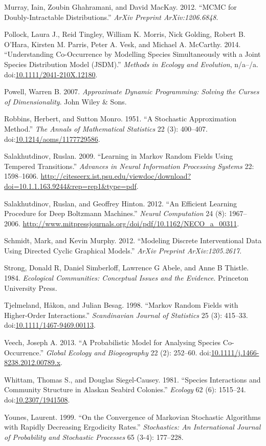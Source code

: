 Murray, Iain, Zoubin Ghahramani, and David MacKay. 2012. ``MCMC for
Doubly-Intractable Distributions.'' \emph{ArXiv Preprint
ArXiv:1206.6848}.

Pollock, Laura J., Reid Tingley, William K. Morris, Nick Golding, Robert
B. O'Hara, Kirsten M. Parris, Peter A. Vesk, and Michael A. McCarthy.
2014. ``Understanding Co-Occurrence by Modelling Species Simultaneously
with a Joint Species Distribution Model (JSDM).'' \emph{Methods in
Ecology and Evolution}, n/a--/a.
doi:\href{http://dx.doi.org/10.1111/2041-210X.12180}{10.1111/2041-210X.12180}.

Powell, Warren B. 2007. \emph{Approximate Dynamic Programming: Solving
the Curses of Dimensionality}. John Wiley \& Sons.

Robbins, Herbert, and Sutton Monro. 1951. ``A Stochastic Approximation
Method.'' \emph{The Annals of Mathematical Statistics} 22 (3): 400--407.
doi:\href{http://dx.doi.org/10.1214/aoms/1177729586}{10.1214/aoms/1177729586}.

Salakhutdinov, Ruslan. 2009. ``Learning in Markov Random Fields Using
Tempered Transitions.'' \emph{Advances in Neural Information Processing
Systems} 22: 1598--1606.
\url{http://citeseerx.ist.psu.edu/viewdoc/download?doi=10.1.1.163.9244\&rep=rep1\&type=pdf}.

Salakhutdinov, Ruslan, and Geoffrey Hinton. 2012. ``An Efficient
Learning Procedure for Deep Boltzmann Machines.'' \emph{Neural
Computation} 24 (8): 1967--2006.
\url{http://www.mitpressjournals.org/doi/pdf/10.1162/NECO_a_00311}.

Schmidt, Mark, and Kevin Murphy. 2012. ``Modeling Discrete
Interventional Data Using Directed Cyclic Graphical Models.''
\emph{ArXiv Preprint ArXiv:1205.2617}.

Strong, Donald R, Daniel Simberloff, Lawrence G Abele, and Anne B
Thistle. 1984. \emph{Ecological Communities: Conceptual Issues and the
Evidence}. Princeton University Press.

Tjelmeland, Håkon, and Julian Besag. 1998. ``Markov Random Fields with
Higher-Order Interactions.'' \emph{Scandinavian Journal of Statistics}
25 (3): 415--33.
doi:\href{http://dx.doi.org/10.1111/1467-9469.00113}{10.1111/1467-9469.00113}.

Veech, Joseph A. 2013. ``A Probabilistic Model for Analysing Species
Co-Occurrence.'' \emph{Global Ecology and Biogeography} 22 (2): 252--60.
doi:\href{http://dx.doi.org/10.1111/j.1466-8238.2012.00789.x}{10.1111/j.1466-8238.2012.00789.x}.

Whittam, Thomas S., and Douglas Siegel-Causey. 1981. ``Species
Interactions and Community Structure in Alaskan Seabird Colonies.''
\emph{Ecology} 62 (6): 1515--24.
doi:\href{http://dx.doi.org/10.2307/1941508}{10.2307/1941508}.

Younes, Laurent. 1999. ``On the Convergence of Markovian Stochastic
Algorithms with Rapidly Decreasing Ergodicity Rates.''
\emph{Stochastics: An International Journal of Probability and
Stochastic Processes} 65 (3-4): 177--228.
